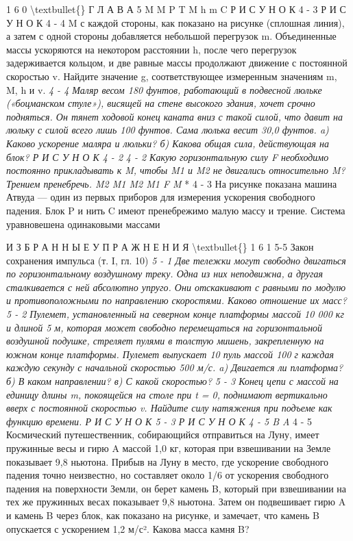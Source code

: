 \documentclass[10pt,oneside]{article}
\begin{document}
1 6 0 \textbackslash{}textbullet\{\} Г Л А В А  5 M M P T M h m C Р И С У Н О К  4 - 3 Р И С У Н О К  4 - 4 M с каждой стороны, как показано на рисунке (сплошная линия), а затем с одной стороны добавляется небольшой перегрузок m. Объединенные массы ускоряются на некотором расстоянии h, после чего перегрузок задерживается кольцом, и две равные массы продолжают движение с постоянной скоростью v. Найдите значение g, соответствующее измеренным значениям m, M, h и v. \emph{ } \emph{ 4 - 4 Маляр весом 180 фунтов, работающий в подвесной люльке («боцманском стуле»), висящей на стене высокого здания, хочет срочно подняться. Он тянет ходовой конец каната вниз с такой силой, что давит на люльку с силой всего лишь 100 фунтов. Сама люлька весит 30,0 фунтов. a) Каково ускорение маляра и люльки? б) Какова общая сила, действующая на блок? Р И С У Н О К  4 - 2 } \emph{ 4 - 2 Какую горизонтальную силу F необходимо постоянно прикладывать к M, чтобы M1 и M2 не двигались относительно M? Трением пренебречь. M2 M1 M2 M1 F M } * 4 - 3 На рисунке показана машина Атвуда --- один из первых приборов для измерения ускорения свободного падения. Блок P и нить C имеют пренебрежимо малую массу и трение. Система уравновешена одинаковыми массами\par

И З Б Р А Н Н Ы Е  У П Р А Ж Н Е Н И Я \textbackslash{}textbullet\{\} 1 6 1 5-5 Закон сохранения импульса (т. I, гл. 10) \emph{ 5 - 1 Две тележки могут свободно двигаться по горизонтальному воздушному треку. Одна из них неподвижна, а другая сталкивается с ней абсолютно упруго. Они отскакивают с равными по модулю и противоположными по направлению скоростями. Каково отношение их масс? } \emph{ 5 - 2 Пулемет, установленный на северном конце платформы массой 10 000 кг и длиной 5 м, которая может свободно перемещаться на горизонтальной воздушной подушке, стреляет пулями в толстую мишень, закрепленную на южном конце платформы. Пулемет выпускает 10 пуль массой 100 г каждая каждую секунду с начальной скоростью 500 м/с. a) Двигается ли платформа? б) В каком направлении? в) С какой скоростью? } \emph{ 5 - 3 Конец цепи с массой на единицу длины m, покоящейся на столе при t = 0, поднимают вертикально вверх с постоянной скоростью v. Найдите силу натяжения при подъеме как функцию времени. Р И С У Н О К  5 - 3 Р И С У Н О К  4 - 5 B A } \emph{ } 4 - 5 Космический путешественник, собирающийся отправиться на Луну, имеет пружинные весы и гирю A массой 1,0 кг, которая при взвешивании на Земле показывает 9,8 ньютона. Прибыв на Луну в место, где ускорение свободного падения точно неизвестно, но составляет около 1/6 от ускорения свободного падения на поверхности Земли, он берет камень B, который при взвешивании на тех же пружинных весах показывает 9,8 ньютона. Затем он подвешивает гирю A и камень B через блок, как показано на рисунке, и замечает, что камень B опускается с ускорением 1,2 м/с². Какова масса камня B?\par
\end{document}
